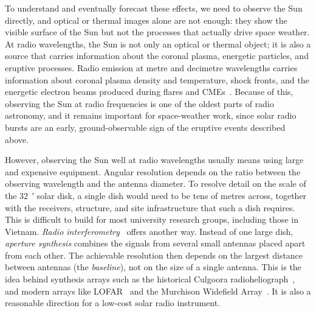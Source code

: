 To understand and eventually forecast these effects, we need to observe the Sun
directly, and optical or thermal images alone are not enough: they show the
visible surface of the Sun but not the processes that actually drive space
weather. At radio wavelengths, the Sun is not only an optical or thermal
object; it is also a source that carries information about the coronal plasma,
energetic particles, and eruptive processes. Radio emission at metre and
decimetre wavelengths carries information about coronal plasma density and
temperature, shock fronts, and the energetic electron beams produced during
flares and CMEs~\citep{dulk1985,kundu1965,wild1963}. Because of this, observing
the Sun at radio frequencies is one of the oldest parts of radio astronomy, and
it remains important for space-weather work, since solar radio bursts are an
early, ground-observable sign of the eruptive events described above.

However, observing the Sun well at radio wavelengths usually means using large
and expensive equipment. Angular resolution depends on the ratio between the
observing wavelength and the antenna diameter. To resolve detail on the scale
of the \SI{32}{\arcminute} solar disk, a single dish would need to be tens of
metres across, together with the receivers, structure, and site infrastructure
that such a dish requires. This is difficult to build for most university
research groups, including those in Vietnam. \emph{Radio
interferometry}~\citep{tms2017,taylor1999synthesis} offers another way.
Instead of one large dish, \emph{aperture synthesis} combines the signals from
several small antennas placed apart from each other. The achievable resolution
then depends on the largest distance between antennas (the \emph{baseline}),
not on the size of a single antenna. This is the idea behind synthesis arrays
such as the historical Culgoora radioheliograph~\citep{mclean1985}, and modern
arrays like LOFAR~\citep{lofar2013} and the Murchison Widefield
Array~\citep{mwa2013}. It is also a reasonable direction for a low-cost solar
radio instrument.

